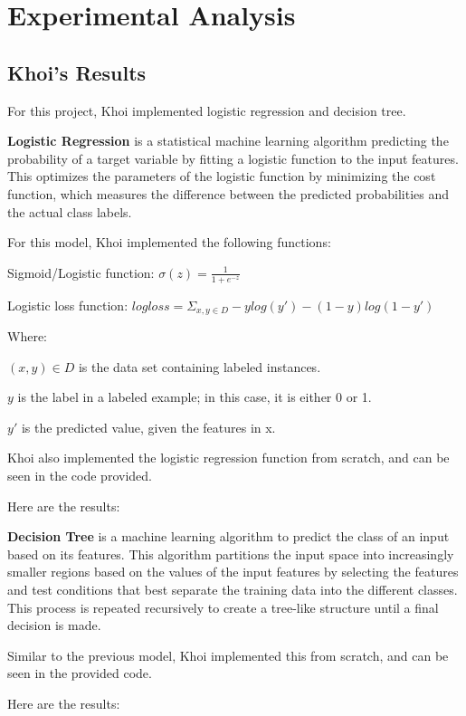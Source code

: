 \section{Experimental Analysis}

\subsection{Khoi's Results}

For this project, Khoi implemented logistic regression and decision tree.

\textbf{Logistic Regression} is a statistical machine learning algorithm predicting the probability of a target variable by fitting a logistic function to the input features. This optimizes the parameters of the logistic function by minimizing the cost function, which measures the difference between the predicted probabilities and the actual class labels.

For this model, Khoi implemented the following functions:

Sigmoid/Logistic function: $\sigma(z) = \frac{1}{1 + e^{-z}}$

Logistic loss function: $log loss = \Sigma_{x, y \in D} -ylog(y') - (1 - y)log(1 - y')$

Where:

$(x, y) \in D$ is the data set containing labeled instances.

$y$ is the label in a labeled example; in this case, it is either 0 or 1.

$y'$ is the predicted value, given the features in x.

Khoi also implemented the logistic regression function from scratch, and can be seen in the code provided.

Here are the results:

\textbf{Decision Tree} is a machine learning algorithm to predict the class of an input based on its features. This algorithm partitions the input space into increasingly smaller regions based on the values of the input features by selecting the features and test conditions that best separate the training data into the different classes. This process is repeated recursively to create a tree-like structure until a final decision is made.

Similar to the previous model, Khoi implemented this from scratch, and can be seen in the provided code.

Here are the results:
